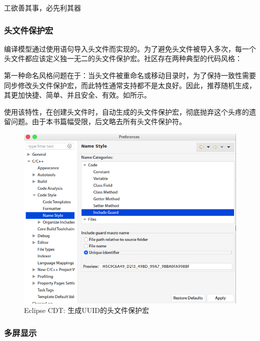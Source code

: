 \begin{content}
\begin{episode}{工欲善其事，必先利其器}
\begin{content}
\subsubsection{头文件保护宏}

编译模型通过使用语句导入头文件而实现的。为了避免头文件被导入多次，每一个头文件都应该定义独一无二的头文件保护宏。社区存在两种典型的代码风格：

\begin{enum}
\end{enum}

第一种命名风格问题在于：当头文件被重命名或移动目录时，为了保持一致性需要同步修改头文件保护宏，而此特性通常支持都不是太良好。因此，推荐随机生成，其更加快捷、简单、并且安全、有效。如所示。

使用该特性，在创建头文件时，自动生成的头文件保护宏，彻底抛弃这个头疼的遗留问题。由于本书篇幅受限，后文略去所有头文件保护符。

\begin{figure}[H]
\centering
\includegraphics[width=1.0\textwidth]{figures/xunit/eclipse-include-guard.png}
\caption{Eclipse CDT: 生成UUID的头文件保护宏}
 \label{fig:eclipse-include-guard}
\end{figure}

\subsubsection{多屏显示}


\end{content}
\end{episode}
\end{content}
